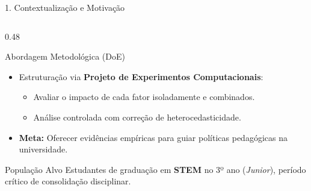 \documentclass[aspectratio=169, 10pt]{beamer}
\begin{document}
\begin{frame}{1. Contextualização e Motivação}
\begin{columns}[T]
        \begin{column}{0.48\textwidth}
            \begin{block}{Abordagem Metodológica (DoE)}
                \begin{itemize}\setlength{\itemsep}{5pt}
                    \item Estruturação via \textbf{Projeto de Experimentos Computacionais}:
                    \begin{itemize}
                        \item Avaliar o impacto de cada fator isoladamente e combinados.
                        \item Análise controlada com correção de heterocedasticidade.
                    \end{itemize}
                    \item \textbf{Meta:} Oferecer evidências empíricas para guiar políticas pedagógicas na universidade.
                \end{itemize}
            \end{block}
            \begin{exampleblock}{População Alvo}
                Estudantes de graduação em \textbf{STEM} no 3º ano (\textit{Junior}), período crítico de consolidação disciplinar.
            \end{exampleblock}
        \end{column}
    \end{columns}
\end{frame}
\end{document}
